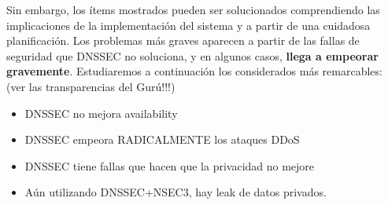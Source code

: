 Sin embargo, los \'items mostrados pueden ser solucionados comprendiendo las implicaciones de la implementaci\'on del sistema y a partir de una cuidadosa planificaci\'on. Los problemas m\'as graves aparecen a partir de las fallas de seguridad que DNSSEC no soluciona, y en algunos casos, \textbf{llega a empeorar gravemente}. Estudiaremos a continuaci\'on los considerados m\'as remarcables: (ver las transparencias del Gur\'u!!!)

\begin{itemize}
	\item DNSSEC no mejora availability
	\item DNSSEC empeora RADICALMENTE los ataques DDoS
	\item DNSSEC tiene fallas que hacen que la privacidad no mejore
	\item A\'un utilizando DNSSEC+NSEC3, hay leak de datos privados.
\end{itemize}